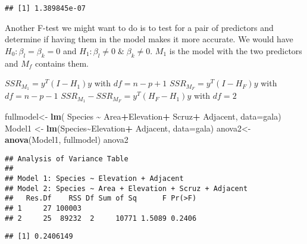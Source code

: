 \documentclass[
]{article}
\newenvironment{Shaded}{\begin{snugshade}}{\end{snugshade}}
\newcommand{\AttributeTok}[1]{\textcolor[rgb]{0.13,0.29,0.53}{#1}}
\newcommand{\DecValTok}[1]{\textcolor[rgb]{0.00,0.00,0.81}{#1}}
\newcommand{\FunctionTok}[1]{\textcolor[rgb]{0.13,0.29,0.53}{\textbf{#1}}}
\newcommand{\NormalTok}[1]{#1}
\newcommand{\OtherTok}[1]{\textcolor[rgb]{0.56,0.35,0.01}{#1}}
\newcommand{\SpecialCharTok}[1]{\textcolor[rgb]{0.81,0.36,0.00}{\textbf{#1}}}
\begin{document}
\begin{verbatim}
## [1] 1.389845e-07
\end{verbatim}

Another F-test we might want to do is to test for a pair of predictors
and determine if having them in the model makes it more accurate. We
would have \(H_0:\beta_l=\beta_k=0\) and
\(H_1:\beta_l\neq0\;\&\;\beta_k\neq0\). \(M_1\) is the model with the
two predictors and \(M_f\) contains them.

\(SSR_{M_1}=y^T(I-H_1)y\) with \(df=n-p+1\) \(SSR_{M_F}=y^T(I-H_F)y\)
with \(df=n-p-1\) \(SSR_{M_1}-SSR_{M_F}=y^T(H_F-H_1)y\) with \(df=2\)

\begin{Shaded}
\begin{Highlighting}[]
\NormalTok{fullmodel}\OtherTok{\textless{}{-}} \FunctionTok{lm}\NormalTok{( Species }\SpecialCharTok{\textasciitilde{}}\NormalTok{ Area}\SpecialCharTok{+}\NormalTok{Elevation}\SpecialCharTok{+}\NormalTok{ Scruz}\SpecialCharTok{+}\NormalTok{ Adjacent, }\AttributeTok{data=}\NormalTok{gala)}
\NormalTok{Model1 }\OtherTok{\textless{}{-}} \FunctionTok{lm}\NormalTok{(Species}\SpecialCharTok{\textasciitilde{}}\NormalTok{Elevation}\SpecialCharTok{+}\NormalTok{ Adjacent, }\AttributeTok{data=}\NormalTok{gala)}
\NormalTok{anova2}\OtherTok{\textless{}{-}}\FunctionTok{anova}\NormalTok{(Model1, fullmodel)}
\NormalTok{anova2}
\end{Highlighting}
\end{Shaded}

\begin{verbatim}
## Analysis of Variance Table
## 
## Model 1: Species ~ Elevation + Adjacent
## Model 2: Species ~ Area + Elevation + Scruz + Adjacent
##   Res.Df    RSS Df Sum of Sq      F Pr(>F)
## 1     27 100003                           
## 2     25  89232  2     10771 1.5089 0.2406
\end{verbatim}

\begin{Shaded}
\end{Shaded}

\begin{verbatim}
## [1] 0.2406149
\end{verbatim}
\end{document}
